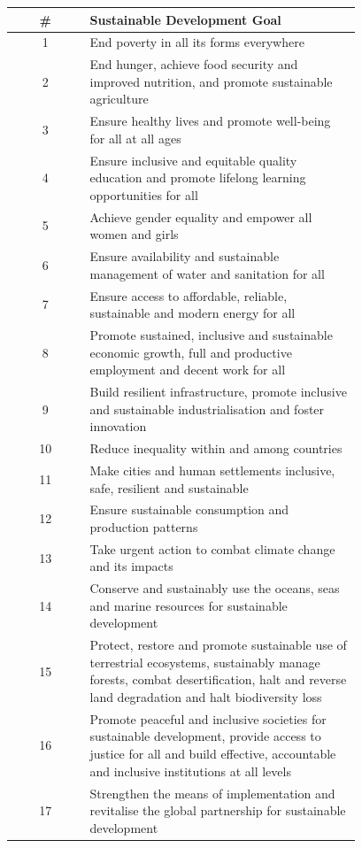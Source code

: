 \begin{center}
\footnotesize
\renewcommand{\arraystretch}{1.3}
\begin{longtable}{cp{0.78\linewidth}}
\toprule
\textbf{\#} & \textbf{Sustainable Development Goal} \\
\midrule
1 & End poverty in all its forms everywhere \\
2 & End hunger, achieve food security and improved nutrition, and promote sustainable agriculture \\
3 & Ensure healthy lives and promote well-being for all at all ages \\
4 & Ensure inclusive and equitable quality education and promote lifelong learning opportunities for all \\
5 & Achieve gender equality and empower all women and girls \\
6 & Ensure availability and sustainable management of water and sanitation for all \\
7 & Ensure access to affordable, reliable, sustainable and modern energy for all \\
8 & Promote sustained, inclusive and sustainable economic growth, full and productive employment and decent work for all \\
9 & Build resilient infrastructure, promote inclusive and sustainable industrialisation and foster innovation \\
10 & Reduce inequality within and among countries \\
11 & Make cities and human settlements inclusive, safe, resilient and sustainable \\
12 & Ensure sustainable consumption and production patterns \\
13 & Take urgent action to combat climate change and its impacts \\
14 & Conserve and sustainably use the oceans, seas and marine resources for sustainable development \\
15 & Protect, restore and promote sustainable use of terrestrial ecosystems, sustainably manage forests, combat desertification, halt and reverse land degradation and halt biodiversity loss \\
16 & Promote peaceful and inclusive societies for sustainable development, provide access to justice for all and build effective, accountable and inclusive institutions at all levels \\
17 & Strengthen the means of implementation and revitalise the global partnership for sustainable development \\
\bottomrule
\end{longtable}
\end{center}

